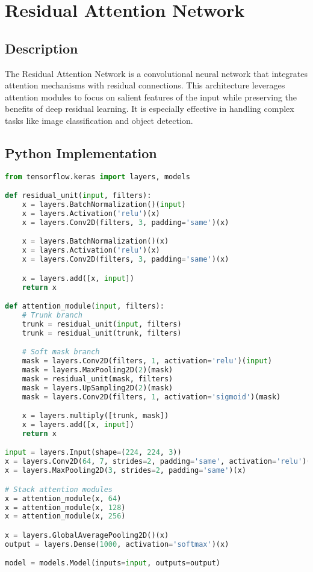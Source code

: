 \chapter{Residual Attention Network}

\section{Description}
The Residual Attention Network is a convolutional neural network that integrates attention mechanisms with residual connections. This architecture leverages attention modules to focus on salient features of the input while preserving the benefits of deep residual learning. It is especially effective in handling complex tasks like image classification and object detection.

\section{Python Implementation}
\begin{lstlisting}[language=Python]
from tensorflow.keras import layers, models

def residual_unit(input, filters):
    x = layers.BatchNormalization()(input)
    x = layers.Activation('relu')(x)
    x = layers.Conv2D(filters, 3, padding='same')(x)

    x = layers.BatchNormalization()(x)
    x = layers.Activation('relu')(x)
    x = layers.Conv2D(filters, 3, padding='same')(x)

    x = layers.add([x, input])
    return x

def attention_module(input, filters):
    # Trunk branch
    trunk = residual_unit(input, filters)
    trunk = residual_unit(trunk, filters)

    # Soft mask branch
    mask = layers.Conv2D(filters, 1, activation='relu')(input)
    mask = layers.MaxPooling2D(2)(mask)
    mask = residual_unit(mask, filters)
    mask = layers.UpSampling2D(2)(mask)
    mask = layers.Conv2D(filters, 1, activation='sigmoid')(mask)

    x = layers.multiply([trunk, mask])
    x = layers.add([x, input])
    return x

input = layers.Input(shape=(224, 224, 3))
x = layers.Conv2D(64, 7, strides=2, padding='same', activation='relu')(input)
x = layers.MaxPooling2D(3, strides=2, padding='same')(x)

# Stack attention modules
x = attention_module(x, 64)
x = attention_module(x, 128)
x = attention_module(x, 256)

x = layers.GlobalAveragePooling2D()(x)
output = layers.Dense(1000, activation='softmax')(x)

model = models.Model(inputs=input, outputs=output)
\end{lstlisting}


